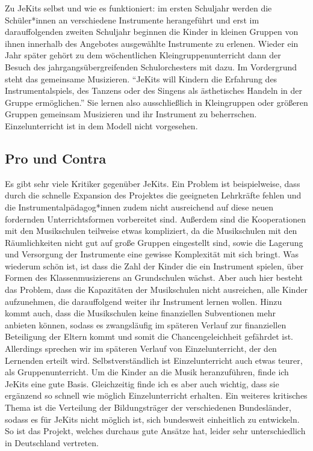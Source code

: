 Zu JeKits selbst und wie es funktioniert: im ersten Schuljahr werden die
Schüler*innen an verschiedene Instrumente herangeführt und erst im
darauffolgenden zweiten Schuljahr beginnen die Kinder in kleinen Gruppen von
ihnen innerhalb des Angebotes ausgewählte
Instrumente zu erlenen. Wieder ein Jahr später gehört zu dem wöchentlichen
Kleingruppenunterricht dann der Besuch des jahrgangsübergreifenden
Schulorchesters mit dazu. Im Vordergrund steht das gemeinsame Musizieren.
\enquote{JeKits will Kindern die Erfahrung des Instrumentalspiels, des Tanzens
oder des Singens als ästhetisches Handeln in der Gruppe ermöglichen.}
\autocite{https://de.wikipedia.org/wiki/JeKits}
Sie lernen also ausschließlich in Kleingruppen oder größeren Gruppen gemeinsam
Musizieren und ihr Instrument zu beherrschen. Einzelunterricht ist in dem Modell
nicht vorgesehen.


\subsection{Pro und Contra}
Es gibt sehr viele Kritiker gegenüber JeKits. Ein Problem ist beispielweise,
dass durch die schnelle Expansion des Projektes die geeigneten Lehrkräfte fehlen
und die Instrumentalpädagog*innen zudem nicht ausreichend auf diese neuen
fordernden Unterrichtsformen vorbereitet sind. Außerdem sind die Kooperationen
mit den Musikschulen teilweise etwas kompliziert, da die Musikschulen mit den
Räumlichkeiten nicht gut auf große Gruppen eingestellt sind, sowie die Lagerung
und Versorgung der Instrumente eine gewisse Komplexität mit sich bringt. Was
wiederum schön ist, ist dass die Zahl der Kinder die ein Instrument spielen,
über Formen des Klassenmusizierens an Grundschulen wächst.
\autocite[119]{ernst:die_zukunftsfaehige_musikschule} Aber auch hier besteht das
Problem, dass die Kapazitäten der Musikschulen nicht ausreichen, alle Kinder
aufzunehmen, die darauffolgend weiter ihr Instrument lernen wollen. Hinzu kommt
auch, dass die Musikschulen keine finanziellen Subventionen mehr anbieten
können, sodass es zwangsläufig im späteren Verlauf zur finanziellen Beteiligung der Eltern
kommt und somit die Chancengeleichheit gefährdet ist. Allerdings sprechen wir im
späteren Verlauf von Einzelunterricht, der den Lernenden erteilt wird.
Selbstverständlich ist Einzelunterricht auch etwas teurer, als
Gruppenunterricht. Um die Kinder an die Musik heranzuführen, finde ich JeKits
eine gute Basis. Gleichzeitig finde ich es aber auch wichtig, dass sie ergänzend
so schnell wie möglich Einzelunterricht erhalten. Ein weiteres kritisches Thema ist
die Verteilung der Bildungsträger der verschiedenen Bundesländer, sodass
es für JeKits nicht möglich ist, sich bundesweit einheitlich zu entwickeln. So
ist das Projekt, welches durchaus gute Ansätze hat, leider sehr unterschiedlich
in Deutschland vertreten. 
